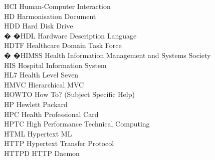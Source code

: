 \begin{tabbing}

    \>HCI \>\>Human-Computer Interaction\\

    \>HD \>\>Harmonisation Document\\

    \>HDD \>\>Hard Disk Drive\\

 � �\>HDL \>\>Hardware Description Language\\


    \>HDTF \>\>Healthcare Domain Task Force\\


 � �\>HIMSS \>\>Health Information Management and Systems Society\\


    \>HIS \>\>Hospital Information System\\

    \>HL7 \>\>Health Level Seven\\

    \>HMVC \>\>Hierarchical MVC\\

    \>HOWTO \>\>How To? (Subject Specific Help)\\

    \>HP \>\>Hewlett Packard\\

    \>HPC \>\>Health Professional Card\\

    \>HPTC \>\>High Performance Technical Computing\\

    \>HTML \>\>Hypertext ML\\

    \>HTTP \>\>Hypertext Transfer Protocol\\


    \>HTTPD \>\>HTTP Daemon\\


\end{tabbing}
